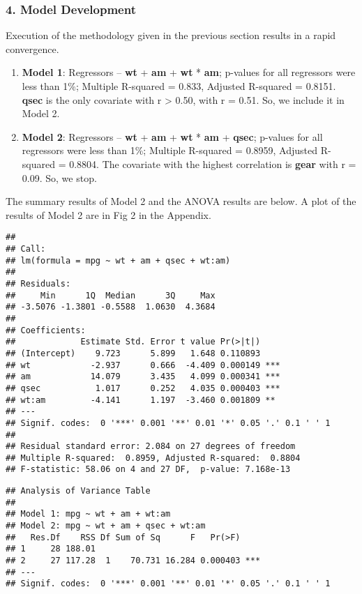 \documentclass[10pt,]{article}
\begin{document}
\subsubsection{4. Model Development}\label{model-development}

Execution of the methodology given in the previous section results in a
rapid convergence.

\begin{enumerate}
\def\labelenumi{\arabic{enumi}.}
\itemsep1pt\parskip0pt
\item
  \textbf{Model 1}: Regressors -- \textbf{wt} + \textbf{am} +
  \textbf{wt} * \textbf{am}; p-values for all regressors were less than
  1\%; Multiple R-squared = 0.833, Adjusted R-squared = 0.8151.
  \textbf{qsec} is the only covariate with \textbar{}r\textbar{}
  \textgreater{} 0.50, with r = 0.51. So, we include it in Model 2.
\item
  \textbf{Model 2}: Regressors -- \textbf{wt} + \textbf{am} +
  \textbf{wt} * \textbf{am} + \textbf{qsec}; p-values for all regressors
  were less than 1\%; Multiple R-squared = 0.8959, Adjusted R-squared =
  0.8804. The covariate with the highest correlation is \textbf{gear}
  with r = 0.09. So, we stop.
\end{enumerate}

The summary results of Model 2 and the ANOVA results are below. A plot
of the results of Model 2 are in Fig 2 in the Appendix.

\begin{verbatim}
## 
## Call:
## lm(formula = mpg ~ wt + am + qsec + wt:am)
## 
## Residuals:
##     Min      1Q  Median      3Q     Max 
## -3.5076 -1.3801 -0.5588  1.0630  4.3684 
## 
## Coefficients:
##             Estimate Std. Error t value Pr(>|t|)    
## (Intercept)    9.723      5.899   1.648 0.110893    
## wt            -2.937      0.666  -4.409 0.000149 ***
## am            14.079      3.435   4.099 0.000341 ***
## qsec           1.017      0.252   4.035 0.000403 ***
## wt:am         -4.141      1.197  -3.460 0.001809 ** 
## ---
## Signif. codes:  0 '***' 0.001 '**' 0.01 '*' 0.05 '.' 0.1 ' ' 1
## 
## Residual standard error: 2.084 on 27 degrees of freedom
## Multiple R-squared:  0.8959, Adjusted R-squared:  0.8804 
## F-statistic: 58.06 on 4 and 27 DF,  p-value: 7.168e-13
\end{verbatim}

\begin{verbatim}
## Analysis of Variance Table
## 
## Model 1: mpg ~ wt + am + wt:am
## Model 2: mpg ~ wt + am + qsec + wt:am
##   Res.Df    RSS Df Sum of Sq      F   Pr(>F)    
## 1     28 188.01                                 
## 2     27 117.28  1    70.731 16.284 0.000403 ***
## ---
## Signif. codes:  0 '***' 0.001 '**' 0.01 '*' 0.05 '.' 0.1 ' ' 1
\end{verbatim}
\end{document}
